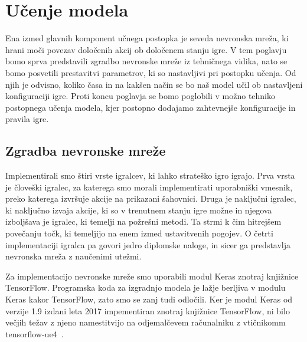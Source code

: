 \documentclass[a4paper, 12pt]{book}
\begin{document}
\chapter{Učenje modela}
\label{chucenjemodela}
Ena izmed glavnih komponent učnega postopka je seveda nevronska mreža, ki hrani moči povezav določenih akcij ob določenem stanju igre.
V tem poglavju bomo sprva predstavili zgradbo nevronske mreže iz tehničnega vidika, nato se bomo posvetili prestavitvi parametrov, ki so nastavljivi pri postopku učenja.
Od njih je odvisno, koliko časa in na kakšen način se bo naš model učil ob nastavljeni konfiguraciji igre.
Proti koncu poglavja se bomo poglobili v možno tehniko postopnega učenja modela, kjer postopno dodajamo zahtevnejše konfiguracije in pravila igre.

\section{Zgradba nevronske mreže}
Implementirali smo štiri vrste igralcev, ki lahko strateško igro igrajo.
Prva vrsta je človeški igralec, za katerega smo morali implementirati uporabniški vmesnik, preko katerega izvršuje akcije na prikazani šahovnici.
Druga je naključni igralec, ki naključno izvaja akcije, ki so v trenutnem stanju igre možne in njegova izboljšava je igralec, ki temelji na požrešni metodi.
Ta strmi k čim hitrejšem povečanju točk, ki temeljijo na enem izmed ustavitvenih pogojev.
O četrti implementaciji igralca pa govori jedro diplomske naloge, in sicer ga predstavlja nevronska mreža z naučenimi utežmi.

Za implementacijo nevronske mreže smo uporabili modul Keras znotraj knjižnice TensorFlow.
Programska koda za izgradnjo modela je lažje berljiva v modulu Keras kakor TensorFlow, zato smo se zanj tudi odločili.
Ker je modul Keras od verzije 1.9 izdani leta 2017 impementiran znotraj knjižnice TensorFlow, ni bilo večjih težav z njeno namestitvijo na odjemalčevem računalniku z vtičnikomm tensorflow-ue4~\cite{ue4tf}.
\end{document}
